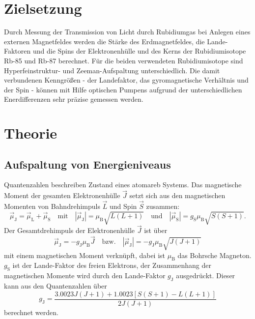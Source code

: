 \section{Zielsetzung}
Durch Messung der Transmission von Licht durch Rubidiumgas bei Anlegen eines externen Magnetfeldes werden die
Stärke des Erdmagnetfeldes, die Lande-Faktoren und die Spins der Elektronenhülle und des Kerns der Rubidiumisotope
Rb-85 und Rb-87 berechnet.
Für die beiden verwendeten Rubidiumisotope sind Hyperfeinstruktur- und Zeeman-Aufspaltung unterschiedlich. Die damit
verbundenen Kenngrößen - der Landefaktor, das gyromagnetische Verhältnis und der Spin - können mit Hilfe optischen
Pumpens aufgrund der unterschiedlichen Enerdifferenzen sehr präzise gemessen werden.

\section{Theorie}

\subsection{Aufspaltung von Energieniveaus}

Quantenzahlen beschreiben Zustand eines atomareb Systems.
Das magnetische Moment der gesamten Elektronenhülle $\vec{J}$ setzt sich aus den magnetischen Momenten von
Bahndrehimpuls $\vec{L}$ und Spin $\vec{S}$ zusammen:
\begin{equation}
  \vec{\mu}_\text{J} = \vec{\mu}_\text{L} + \vec{\mu}_\text{S} \quad \text{mit} \quad |\vec{\mu}_\text{J}| = \mu_\text{B}\sqrt{L (L + 1)} \quad \text{und}
  \quad |\vec{\mu}_\text{S}| = g_\text{S}\mu_\text{B}\sqrt{S (S + 1)}.
\end{equation}
Der Gesamtdrehimpuls der Elektronenhülle $\vec{J}$ ist über
\begin{equation}
  \vec{\mu}_\text{J} = -g_\text{J}\mu_\text{B}\vec{J} \quad \text{bzw.} \quad |\vec{\mu}_\text{J}| = -g_\text{J}\mu_\text{B}\sqrt{J (J + 1)}
  \label{magnMom}
\end{equation}
mit einem magnetischen Moment verknüpft, dabei ist $\mu_\text{B}$ das Bohrsche Magneton.
$g_\text{S}$ ist der Lande-Faktor des freien Elektrons, der Zusammenhang der magnetischen Momente wird durch den
Lande-Faktor $g_\text{J}$ ausgedrückt.
Dieser kann aus den Quantenzahlen über
\begin{equation}
  g_\text{J} = \frac{3.0023J(J+1) + 1.0023[S(S+1) - L(L+1)]}{2J(J+1)}
\end{equation}
berechnet werden.

